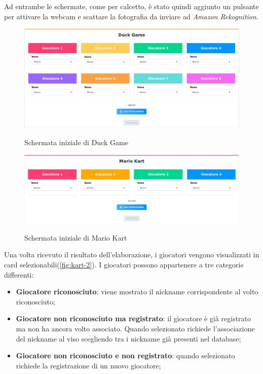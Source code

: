 		Ad entrambe le schermate, come per calcetto, è stato quindi aggiunto un pulsante per attivare la webcam e scattare la fotografia da inviare ad \emph{Amazon Rekognition}.
		
		\begin{figure}[H]
			\centering
			\includegraphics[width=\textwidth]{immagini/duck-1.png} \\
			\caption{\label{fig:duck-1} Schermata iniziale di Duck Game}
		\end{figure}
	
		\begin{figure}[H]
			\centering
			\includegraphics[width=\textwidth]{immagini/kart-1.png} \\
			\caption{\label{fig:kart-1} Schermata iniziale di Mario Kart}
		\end{figure}
		
		\noindent Una volta ricevuto il risultato dell'elaborazione, i giocatori vengono visualizzati in card selezionabili(\autoref{fig:kart-2}). I giocatori possono appartenere a tre categorie differenti:
		\begin{itemize}
			\item \textbf{Giocatore riconosciuto}: viene mostrato il nickname corrispondente al volto riconosciuto;
			\item \textbf{Giocatore non riconosciuto ma registrato}: il giocatore è già registrato ma non ha ancora volto associato. Quando selezionato richiede l'associazione del nickname al viso scegliendo tra i nickname già presenti nel database; 
			\item\textbf{Giocatore non riconosciuto e non registrato}: quando selezionato richiede la registrazione di un nuovo giocatore; 
		\end{itemize} 
	
